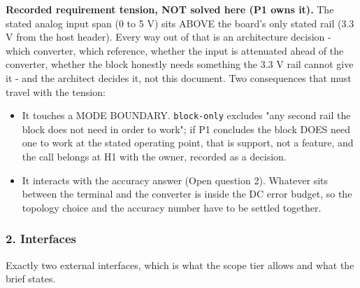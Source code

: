 \documentclass[11pt,a4paper]{article}
\begin{document}
\textbf{Recorded requirement tension, NOT solved here (P1 owns it).} The stated analog input span (0 to 5 V) sits ABOVE the board's only stated rail (3.3 V from the host header). Every way out of that is an architecture decision - which converter, which reference, whether the input is attenuated ahead of the converter, whether the block honestly needs something the 3.3 V rail cannot give it - and the architect decides it, not this document. Two consequences that must travel with the tension:

\begin{itemize}
\item It touches a MODE BOUNDARY. \texttt{block-only} excludes "any second rail the block
does not need in order to work"; if P1 concludes the block DOES need one to
work at the stated operating point, that is support, not a feature, and the
call belongs at H1 with the owner, recorded as a decision.
\item It interacts with the accuracy answer (Open question 2). Whatever sits
between the terminal and the converter is inside the DC error budget, so the
topology choice and the accuracy number have to be settled together.
\end{itemize}
\subsubsection*{2. Interfaces}
Exactly two external interfaces, which is what the scope tier allows and what the brief states.
\end{document}
